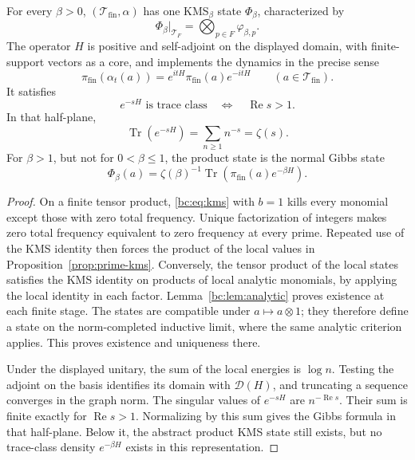 \begin{proposition}
\label{prop:prime-product}
For every \(\beta>0\), \((\mathcal T_{\mathrm{fin}},\alpha)\) has one
KMS\(_\beta\) state \(\Phi_\beta\), characterized by
\[
 \Phi_\beta|_{\mathcal T_F}
 =\bigotimes_{p\in F}\varphi_{\beta,p}.
\]
The operator \(H\) is positive and self-adjoint on the displayed domain,
with finite-support vectors as a core, and implements the dynamics in the precise sense
\[
 \pi_{\mathrm{fin}}(\alpha_t(a))
 =e^{itH}\pi_{\mathrm{fin}}(a)e^{-itH}
 \qquad(a\in\mathcal T_{\mathrm{fin}}).
\]
It satisfies
\[
 e^{-sH}\text{ is trace class}
 \quad\Longleftrightarrow\quad \operatorname{Re}s>1.
\]
In that half-plane,
\begin{equation}
 \operatorname{Tr}(e^{-sH})=\sum_{n\geq1}n^{-s}=\zeta(s).
\label{bc:eq:trace}
\end{equation}
For \(\beta>1\), but not for \(0<\beta\leq1\), the product state is the
normal Gibbs state
\[
 \Phi_\beta(a)=\zeta(\beta)^{-1}
 \operatorname{Tr}(\pi_{\mathrm{fin}}(a)e^{-\beta H}).
\]
\end{proposition}

\begin{proof}
On a finite tensor product, \eqref{bc:eq:kms} with \(b=1\) kills every
monomial except those with zero total frequency.  Unique factorization of integers makes zero
total frequency equivalent to zero frequency at every prime.  Repeated use
of the KMS identity then forces the product of the local values in
Proposition~\ref{prop:prime-kms}. Conversely, the tensor product of the
local states satisfies the KMS identity on products of local analytic
monomials, by applying the local identity in each factor.
Lemma~\ref{bc:lem:analytic} proves existence at each finite stage.
The states are compatible under \(a\mapsto a\otimes1\); they therefore
define a state on the norm-completed inductive limit, where the same
analytic criterion applies. This proves existence and uniqueness there.

Under the displayed unitary, the sum of the local energies is \(\log n\).
Testing the adjoint on the basis identifies its domain with
\(\mathcal D(H)\), and truncating a sequence converges in the graph norm.
The singular values of \(e^{-sH}\) are \(n^{-\operatorname{Re}s}\).  Their
sum is finite exactly for \(\operatorname{Re}s>1\).  Normalizing by this
sum gives the Gibbs formula in that half-plane.  Below it, the abstract
product KMS state still exists, but no trace-class density
\(e^{-\beta H}\) exists in this representation.
\end{proof}

